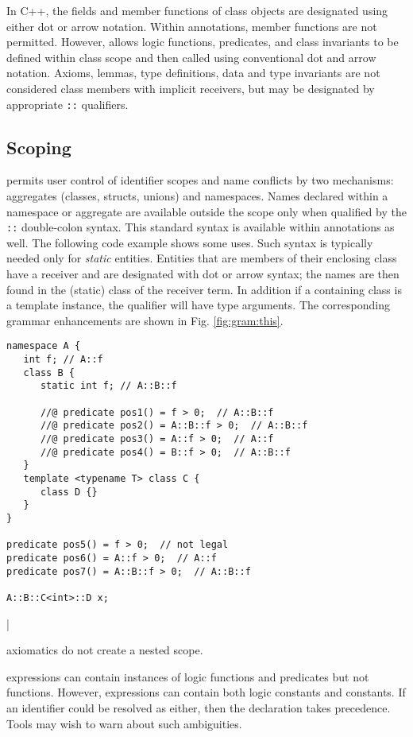 In C++, the fields and member functions of class objects are designated using 
either dot or arrow notation. Within \NAME annotations, \lang member functions are not
permitted. However, \NAME allows logic functions, predicates, and class invariants to be defined
within class scope and then called using conventional \lang dot and arrow notation.
Axioms, lemmas, type definitions, data and type invariants are not considered class members with implicit receivers,
but may be designated by appropriate \lstinline|::| qualifiers.

\subsection{Scoping}

\lang permits user control of identifier scopes and name conflicts by two mechanisms: aggregates (classes, structs, unions)  and namespaces. 
Names declared within a namespace or aggregate are available outside the scope only when qualified by the
\lstinline|::| double-colon syntax. This standard \lang syntax is available within \NAME annotations as well.
The following code example shows some uses. Such syntax is typically needed only for \textit{static} entities.
Entities that are members of their enclosing class have a receiver and are designated with dot or arrow syntax;
the names are then found in the (static) class of the receiver term. In addition if a containing class is a template
instance, the qualifier will have type arguments. The corresponding grammar enhancements are shown in Fig. \ref{fig:gram:this}.
\begin{lstlisting}
namespace A {
   int f; // A::f
   class B {
      static int f; // A::B::f
      
      //@ predicate pos1() = f > 0;  // A::B::f
      //@ predicate pos2() = A::B::f > 0;  // A::B::f
      //@ predicate pos3() = A::f > 0;  // A::f
      //@ predicate pos4() = B::f > 0;  // A::B::f   
   }
   template <typename T> class C {
      class D {}
   }
}

predicate pos5() = f > 0;  // not legal
predicate pos6() = A::f > 0;  // A::f
predicate pos7() = A::B::f > 0;  // A::B::f

A::B::C<int>::D x;
\end{lstlisting}|

\NAME axiomatics do not create a nested scope.

\NAME expressions can contain instances of logic functions and predicates but not \lang functions. However, \NAME expressions can contain both logic constants
and \lang constants. If an identifier could be resolved as either, then the
\lang declaration takes precedence. Tools may wish to warn about such
ambiguities.

